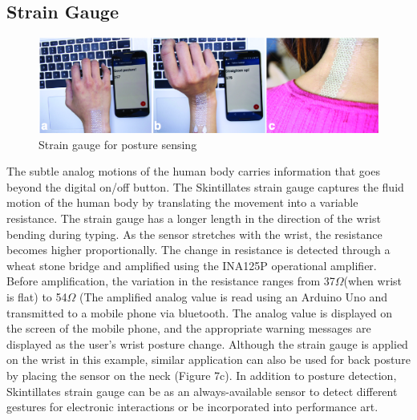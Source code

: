 \documentclass{sigchi}
\begin{document}
\subsection {Strain Gauge}
\begin{figure}[!h]
\centering
\includegraphics[width=1.0\textwidth]{figures/Figure9}
\caption{Strain gauge for posture sensing}
\label{fig:figure9}
\end{figure}
The subtle analog motions of the human body carries information that goes beyond the digital on/off button. The Skintillates strain gauge captures the fluid motion of the human body by translating the movement into a variable resistance. %
 The strain gauge has a longer length in the direction of the wrist bending during typing. As the sensor stretches with the wrist, the resistance becomes higher proportionally. The change in resistance is detected through a wheat stone bridge and amplified using the INA125P operational amplifier. Before amplification, the variation in the resistance ranges from 37$\Omega$(when wrist is flat) to 54$\Omega$ (The amplified analog value is read using an Arduino Uno and transmitted to a mobile phone via bluetooth. %
 The analog value is displayed on the screen of the mobile phone, and the appropriate warning messages are displayed as the user’s wrist posture change. Although the strain gauge is applied on the wrist in this example, similar application can also be used for back posture by placing the sensor on the neck (Figure 7c). In addition to posture detection, Skintillates strain gauge can be as an %
 always-available sensor to detect different gestures for electronic interactions or be incorporated into performance art. 
\end{document}
